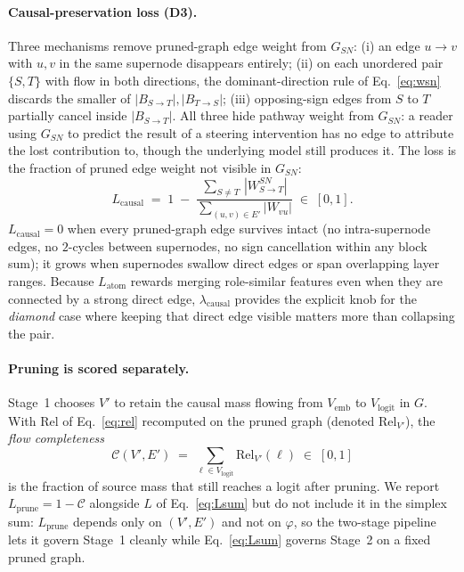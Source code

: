     \paragraph{Causal-preservation loss (D3).}
    Three mechanisms remove pruned-graph edge weight from $G_{SN}$:
    (i) an edge $u \to v$ with $u, v$ in the same supernode disappears
    entirely; (ii) on each unordered pair $\{S, T\}$ with flow in both
    directions, the dominant-direction rule of Eq.~\eqref{eq:wsn}
    discards the smaller of $|B_{S \to T}|, |B_{T \to S}|$;
    (iii) opposing-sign edges from $S$ to $T$ partially cancel inside
    $|B_{S \to T}|$. All three hide pathway weight from $G_{SN}$: a
    reader using $G_{SN}$ to predict the result of a steering
    intervention has no edge to attribute the lost contribution to,
    though the underlying model still produces it. The loss is the
    fraction of pruned edge weight not visible in $G_{SN}$:
    \begin{equation}
    L_{\text{causal}}
    \;=\;
    1 \;-\;
    \frac{\sum_{S \ne T}\, |W^{SN}_{S \to T}|}
         {\sum_{(u, v) \in E'} |W_{vu}|}
    \;\in\; [0, 1].
    \label{eq:Lcausal}
    \end{equation}
    $L_{\text{causal}} = 0$ when every pruned-graph edge survives intact
    (no intra-supernode edges, no $2$-cycles between supernodes, no
    sign cancellation within any block sum); it grows when supernodes
    swallow direct edges or span overlapping layer ranges. Because
    $L_{\text{atom}}$ rewards merging role-similar features even when
    they are connected by a strong direct edge, $\lambda_{\text{causal}}$
    provides the explicit knob for the \emph{diamond} case where keeping
    that direct edge visible matters more than collapsing the pair.

    \paragraph{Pruning is scored separately.}
    Stage~1 chooses $V'$ to retain the causal mass flowing from
    $V_{\text{emb}}$ to $V_{\text{logit}}$ in $G$. With $\mathrm{Rel}$ of
    Eq.~\eqref{eq:rel} recomputed on the pruned graph (denoted
    $\mathrm{Rel}_{V'}$), the \emph{flow completeness}
    \begin{equation}
    \mathcal{C}(V', E')
    \;=\;
    \sum_{\ell \in V_{\text{logit}}} \mathrm{Rel}_{V'}(\ell)
    \;\in\; [0, 1]
    \label{eq:Ccal}
    \end{equation}
    is the fraction of source mass that still reaches a logit after
    pruning. We report $L_{\text{prune}} = 1 - \mathcal{C}$ alongside $L$
    of Eq.~\eqref{eq:Lsum} but do not include it in the simplex sum:
    $L_{\text{prune}}$ depends only on $(V', E')$ and not on $\varphi$, so
    the two-stage pipeline lets it govern Stage~1 cleanly while
    Eq.~\eqref{eq:Lsum} governs Stage~2 on a fixed pruned graph.
